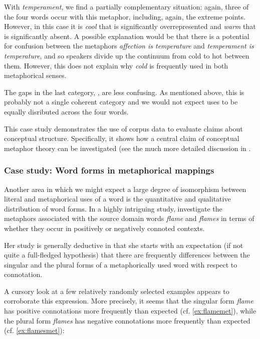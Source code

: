 With \textit{temperament}, we find a partially complementary situation: again, three of the four words occur with this metaphor,  including, again, the extreme points. However, in this case it is \textit{cool} that is significantly overrepresented and \textit{warm} that is significantly absent. A possible explanation would be that there is a potential for confusion between the metaphors \textit{affection is temperature} and \textit{temperament is temperature}, and so speakers divide up the continuum from cold to hot between them. However, this does not explain why \textit{cold} is frequently used in both metaphorical senses.

The gaps in the last category, , are less confusing. As mentioned above, this is probably not a single coherent category and we would not expect uses to be equally disributed across the four words.

This case study demonstrates the use of corpus data to evaluate claims about conceptual structure. Specifically, it shows how a central claim of conceptual metaphor  theory can be investigated (see the much more detailed discussion in \citet{deignan_metaphorical_1999}.

\subsubsection{Case study: Word forms in metaphorical mappings}
\label{sec:flamevsflames}

Another area in which we might expect a large degree of isomorphism between literal  and metaphorical  uses of a word is the quantitative and qualitative distribution  of word forms. In a highly intriguing study, \citet{stefanowitsch_grammar_2006} investigate the metaphors associated  with the source domain words \textit{flame} and \textit{flames} in terms of whether they occur in positively or negatively connoted  contexts.

Her study is generally deductive  in that she starts with an expectation (if not quite a full\hyp{}fledged hypothesis) that there are frequently differences between the singular  and the plural forms of a metaphorically  used word with respect to  connotation.

A cursory look at a few relatively randomly  selected examples appears to corroborate this expression. More precisely, it seems that the singular form \textit{flame} has positive connotations  more frequently than expected  (cf. \ref{ex:flamemet}), while the plural  form \textit{flames} has negative connotations  more frequently than expected (cf. \ref{ex:flamesmet}):

